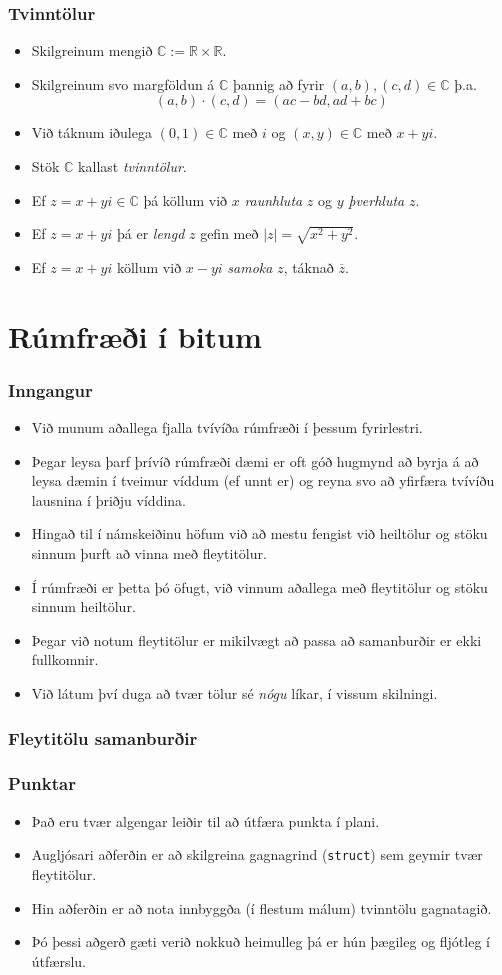 \documentclass{beamer}
\newcommand\env[2]
{
	\begin{#1}
	#2
	\end{#1}
}
\newcommand\code[1]{\tiny}
\begin{document}
\env{frame}
{
	\frametitle{Tvinntölur}
	\env{itemize}
	{
		\item<1-> Skilgreinum mengið $\mathbb{C} := \mathbb{R} \times \mathbb{R}$.
		\item<2-> Skilgreinum svo margföldun á $\mathbb{C}$ þannig að fyrir $(a, b), (c, d) \in \mathbb{C}$ þ.a.
			\[
				(a, b) \cdot (c, d) = (ac - bd, ad + bc)
			\]
		\item<3-> Við táknum iðulega $(0, 1) \in \mathbb{C}$ með $i$ og $(x, y) \in \mathbb{C}$ með $x + yi$.
		\item<4-> Stök $\mathbb{C}$ kallast \emph{tvinntölur}.
		\item<5-> Ef $z = x + yi \in \mathbb{C}$ þá köllum við $x$ \emph{raunhluta} $z$ og $y$ \emph{þverhluta} $z$.
		\item<6-> Ef $z = x + yi$ þá er \emph{lengd} $z$ gefin með $|z| = \sqrt{x^2 + y^2}$.
		\item<6-> Ef $z = x + yi$ köllum við $x - yi$ \emph{samoka} $z$, táknað $\overline{z}$.
	}
}

\section[Rúmfræði í bitum]{Rúmfræði í bitum}

\env{frame}
{
	\frametitle{Inngangur}
	\env{itemize}
	{
		\item<1-> Við munum aðallega fjalla tvívíða rúmfræði í þessum fyrirlestri.
		\item<2-> Þegar leysa þarf þrívíð rúmfræði dæmi er oft góð hugmynd að byrja
			á að leysa dæmin í tveimur víddum (ef unnt er) og reyna svo að yfirfæra
			tvívíðu lausnina í þriðju víddina.
		\item<3-> Hingað til í námskeiðinu höfum við að mestu fengist við heiltölur
			og stöku sinnum þurft að vinna með fleytitölur.
		\item<4-> Í rúmfræði er þetta þó öfugt, við vinnum aðallega með fleytitölur og
			stöku sinnum heiltölur.
		\item<5-> Þegar við notum fleytitölur er mikilvægt að passa að samanburðir er
			ekki fullkomnir.
		\item<6-> Við látum því duga að tvær tölur sé \emph{nógu} líkar, í vissum skilningi.
	}
}

\begin{frame}[fragile]
	\frametitle{Fleytitölu samanburðir}
	\code{comp.h}
\end{frame}

\env{frame}
{
	\frametitle{Punktar}
	\env{itemize}
	{
		\item<1-> Það eru tvær algengar leiðir til að útfæra punkta í plani.
		\item<2-> Augljósari aðferðin er að skilgreina gagnagrind (\texttt{struct}) sem geymir
			tvær fleytitölur.
		\item<3-> Hin aðferðin er að nota innbyggða (í flestum málum) tvinntölu gagnatagið.
		\item<4-> Þó þessi aðgerð gæti verið nokkuð heimulleg þá er hún þægileg og fljótleg í útfærslu.
	}
}
\end{document}

